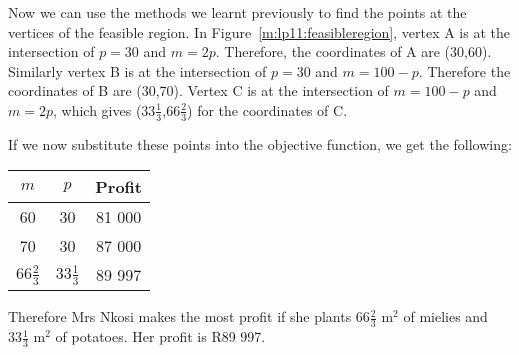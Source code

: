 Now we can use the methods we learnt previously to find the points at the vertices of the feasible region. In Figure~\ref{m:lp11:feasibleregion}, vertex A is at the intersection of $p=30$ and $m=2p$. Therefore, the coordinates of A are (30,60). Similarly vertex B is at the intersection of $p=30$ and $m=100-p$. Therefore the coordinates of B are (30,70). Vertex C is at the intersection of $m=100-p$ and $m=2p$, which gives ($33\frac{1}{3}$,$66\frac{2}{3}$) for the coordinates of C.

If we now substitute these points into the objective function, we get the following:
\begin{center}
\begin{tabular}{|c|c|c|}\hline
$m$&$p$&Profit\\\hline\hline
60&30&81 000\\\hline
70&30&87 000\\\hline
$66\frac{2}{3}$&$33\frac{1}{3}$&89 997\\\hline
\hline
\end{tabular}
\end{center}

Therefore Mrs Nkosi makes the most profit if she plants $66\frac{2}{3}$ m$^2$ of mielies and $33\frac{1}{3}$ m$^2$ of potatoes. Her profit is R89 997.

